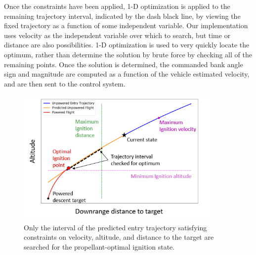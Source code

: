 \documentclass[letterpaper, paper,11pt]{AAS}
\begin{document}
Once the constraints have been applied, 1-D optimization is applied to the remaining trajectory interval, indicated by the dash black line, by viewing the fixed trajectory as a function of some independent variable. Our implementation uses velocity as the independent variable over which to search, but time or distance are also possibilities. 1-D optimization is used to very quickly locate the optimum, rather than determine the solution by brute force by checking all of the remaining points. Once the solution is determined, the commanded bank angle sign and magnitude are computed as a function of the vehicle estimated velocity, and are then sent to the control system.
\begin{figure}[h!]
	\centering
	\includegraphics[width=0.9\textwidth]{H_Vs_S} 
	\caption{Only the interval of the predicted entry trajectory satisfying constraints on velocity, altitude, and distance to the target are searched for the propellant-optimal ignition state.}
	\label{fig_ignition}
\end{figure}
\end{document}
